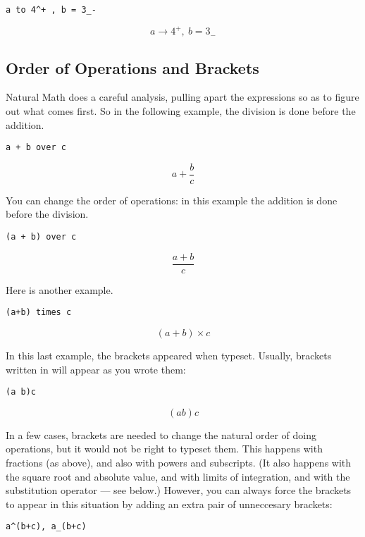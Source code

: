 \documentclass[12pt]{article}
\begin{document}
\begin{verbatim}
a to 4^+ , b = 3_-
\end{verbatim}

\[
a \to {4} ^ {+} , \ b = {3} _ {-}
\]

\noindent \subsection{Order of Operations and Brackets}

\noindent \indent
Natural Math does a careful analysis, pulling apart the expressions
so as to figure out what comes first.  So in the following example,
the division is done before the addition.

\begin{verbatim}
a + b over c
\end{verbatim}

\[
a + \frac {b} {c}
\]

\noindent You can change the order of operations: in this example the addition is
done before the division.

\begin{verbatim}
(a + b) over c
\end{verbatim}

\[
\frac {a + b} {c}
\]

\noindent Here is another example.

\begin{verbatim}
(a+b) times c
\end{verbatim}

\[
\left( a + b \right) \times c
\]

\noindent In this last example, the brackets appeared when typeset.  Usually, brackets
written in will appear as you wrote them: 

\begin{verbatim}
(a b)c
\end{verbatim}

\[
\left( a b \right) c
\]

\noindent In a few cases, brackets are needed to change the natural order of doing
operations, but it would not be right to typeset them.  This happens
with fractions (as above), and also with powers and subscripts.  
(It also happens with the square root and absolute value, and with
limits of integration, and with the substitution operator --- see below.)
However,
you can always force the brackets to appear in this situation by adding an
extra pair of unneccesary brackets:

\begin{verbatim}
a^(b+c), a_(b+c)
\end{verbatim}
\end{document}
